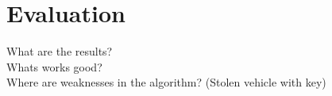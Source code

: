 \chapter{Evaluation}

What are the results? \\
Whats works good? \\
Where are weaknesses in the algorithm? (Stolen vehicle with key) 

\clearpage